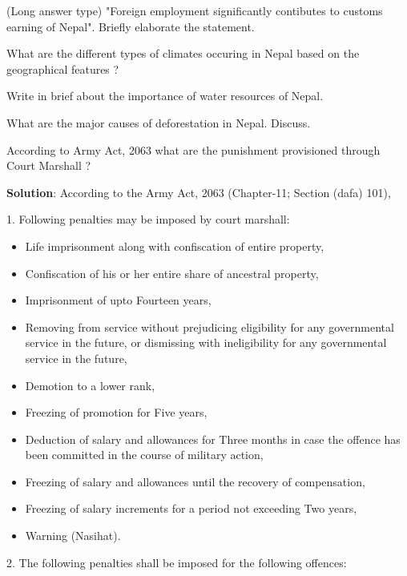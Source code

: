 \documentclass[
]{book}
\newcommand{\question}{\item}
\newenvironment{solution}{ {\bfseries Solution}:}{}
\begin{document}
\begin{questions}
\question (Long answer type) "Foreign employment significantly contibutes to customs earning of Nepal". Briefly elaborate the statement.

\question What are the different types of climates occuring in Nepal based on the geographical features ?

\question Write in brief about the importance of water resources of Nepal.

\question What are the major causes of deforestation in Nepal. Discuss.

\question According to Army Act, 2063 what are the punishment provisioned through Court Marshall ?

\begin{solution}
According to the Army Act, 2063 (Chapter-11; Section (dafa) 101), 

1. Following penalties may be imposed by court marshall:

\begin{itemize}
\item Life imprisonment along with confiscation of entire property,
\item Confiscation of his or her entire share of ancestral property,
\item Imprisonment of upto Fourteen years,
\item Removing from service without prejudicing eligibility for any governmental service in the future, or dismissing with ineligibility for any governmental service in the future,
\item Demotion to a lower rank,
\item Freezing of promotion for Five years,
\item Deduction of salary and allowances for Three months in case the offence has been committed in the course of military action,
\item Freezing of salary and allowances until the recovery of compensation,
\item Freezing of salary increments for a period not  exceeding Two years,
\item Warning (Nasihat).
\end{itemize}

2. The following penalties shall be imposed for the following offences:


\end{solution}
\end{questions}
\end{document}
